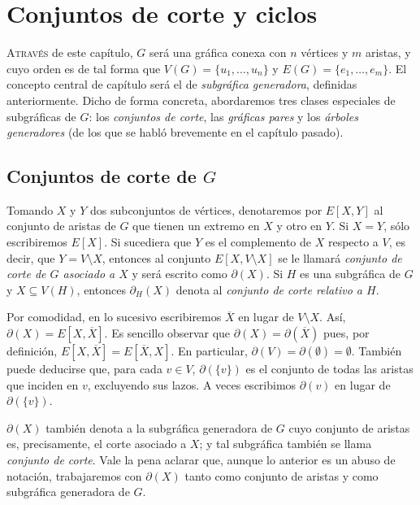 \chapter{Conjuntos de corte y ciclos}

\lettrine[lines=6] {\initfamily \selectfont A} {través} de este capítulo, $G$ será una gráfica conexa con $n$ vértices y $m$ aristas, y cuyo orden es de tal forma que $V(G) = \{u_{1}, \ldots, u_{n}\}$ y $E(G)=\{e_{1}, \ldots, e_{m}\}$. El concepto central de capítulo será el de \textit{subgráfica generadora}, definidas anteriormente. Dicho de forma concreta, abordaremos tres clases especiales de subgráficas de $G$: los \textit{conjuntos de corte}, las \textit{gráficas pares} y los \textit{árboles generadores} (de los que se habló brevemente en el capítulo pasado).

\section{Conjuntos de corte de $G$}

Tomando $X$ y $Y$ dos subconjuntos de vértices, denotaremos por $E[X,Y]$ al conjunto de aristas de $G$ que tienen un extremo en $X$ y otro en $Y$. Si $X = Y$, sólo escribiremos $E[X]$. Si sucediera que $Y$ es el complemento de $X$ respecto a $V$, es decir, que $Y=V \setminus X$, entonces al conjunto $E[X, V \setminus X]$ se le llamará \textit{conjunto de corte de $G$ asociado a $X$} y será escrito como $\partial(X)$. Si $H$ es una subgráfica de $G$ y $X \subseteq V(H)$, entonces $\partial_{H}(X)$ denota al \textit{conjunto de corte relativo a $H$}.

Por comodidad, en lo sucesivo escribiremos $\overline{X}$ en lugar de $V \setminus X$. Así, $\partial(X) = E[X,\overline{X}]$. Es sencillo observar que $\partial(X) = \partial(\overline{X})$ pues, por definición, $E[X,\overline{X}] = E[\overline{X},X]$. En particular, $\partial(V)=\partial(\emptyset) = \emptyset$. También puede deducirse que, para cada  $v \in V$, $\partial(\{v\})$ es el conjunto de todas las aristas que inciden en $v$, excluyendo sus lazos.  A veces escribimos $\partial(v)$ en lugar de $\partial(\{v\})$.

$\partial(X)$ también denota a la subgráfica generadora de $G$ cuyo conjunto de aristas es, precisamente, el corte asociado a $X$; y tal subgráfica también se llama \textit{conjunto de corte}. Vale la pena aclarar que, aunque lo anterior es un abuso de notación, trabajaremos con $\partial(X)$ tanto como conjunto de aristas y como subgráfica generadora de $G$.

